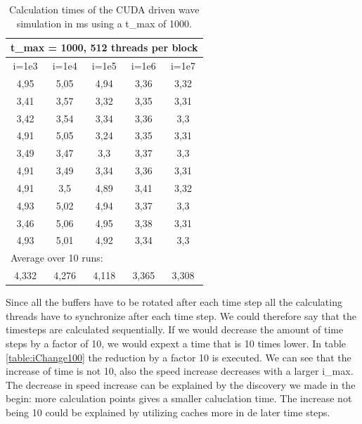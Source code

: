 \documentclass[a4paper]{article}
\begin{document}
		\begin{table}[H]
			\caption{Calculation times of the CUDA driven wave simulation in ms using a t\_max of 1000.}
			\label{table:iChange1000}
			\begin{center}
				\begin{tabular}{| c | c | c | c | c |}
					\hline
					\multicolumn{5}{|l|}{t\_max = 1000, 512 threads per block}\\
					\hline
					i=1e3 & i=1e4 & i=1e5 & i=1e6 & i=1e7\\ 
					\hline
					4,95 & 5,05 & 4,94 & 3,36 & 3,32\\ 
					\hline
					3,41 & 3,57 & 3,32 & 3,35 & 3,31\\ 
					\hline
					3,42 & 3,54 & 3,34 & 3,36 & 3,3\\ 
					\hline
					4,91 & 5,05 & 3,24 & 3,35 & 3,31\\ 
					\hline
					3,49 & 3,47 & 3,3 & 3,37 & 3,3\\ 
					\hline
					4,91 & 3,49 & 3,34 & 3,36 & 3,31\\ 
					\hline
					4,91 & 3,5 & 4,89 & 3,41 & 3,32\\ 
					\hline
					4,93 & 5,02 & 4,94 & 3,37 & 3,3\\ 
					\hline
					3,46 & 5,06 & 4,95 & 3,38 & 3,31\\ 
					\hline
					4,93 & 5,01 & 4,92 & 3,34 & 3,3\\ 
					\hline
					\multicolumn{5}{|l|}{Average over 10 runs:}\\
					\hline
					4,332 & 4,276 & 4,118 & 3,365 & 3,308\\ 
					\hline
				\end{tabular}
			\end{center}
		\end{table}
		
		\noindent Since all the buffers have to be rotated after each time step all the calculating threads have to synchronize after each time step.
		We could therefore say that the timesteps are calculated sequentially.
		If we would decrease the amount of time steps by a factor of 10, we would expext a time that is 10 times lower.
		In table \ref{table:iChange100} the reduction by a factor 10 is executed.
		We can see that the increase of time is not 10, also the speed increase decreases with a larger i\_max.
		The decrease in speed increase can be explained by the discovery we made in the begin: more calculation points gives a smaller caluclation time.
		The increase not being 10 could be explained by utilizing caches more in de later time steps.
		
\end{document}
